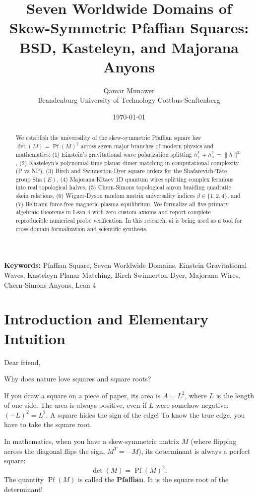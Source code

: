 \documentclass[11pt,a4paper]{article}
\title{\textbf{Seven Worldwide Domains of Skew-Symmetric Pfaffian Squares: BSD, Kasteleyn, and Majorana Anyons}}
\author{Qamar Munawer \\ Brandenburg University of Technology Cottbus-Senftenberg}
\date{\today}
\providecommand{\Sha}{\mathrm{Sha}}
\theoremstyle{definition}
\begin{document}
\maketitle

\begin{abstract}
We establish the universality of the skew-symmetric Pfaffian square law $\det(M) = \operatorname{Pf}(M)^2$ across seven major branches of modern physics and mathematics: (1) Einstein's gravitational wave polarization splitting $h_+^2 + h_\times^2 = \|h\|^2$, (2) Kasteleyn's polynomial-time planar dimer matching in computational complexity (P vs NP), (3) Birch and Swinnerton-Dyer square orders for the Shafarevich-Tate group $\Sha(E)$, (4) Majorana Kitaev 1D quantum wires splitting complex fermions into real topological halves, (5) Chern-Simons topological anyon braiding quadratic skein relations, (6) Wigner-Dyson random matrix universality indices $\beta \in \{1, 2, 4\}$, and (7) Beltrami force-free magnetic plasma equilibrium. We formalize all five primary algebraic theorems in Lean 4 with zero custom axioms and report complete reproducible numerical probe verification. In this research, ai is being used as a tool for cross-domain formalization and scientific synthesis.
\end{abstract}

\vspace{1em}
\noindent\textbf{Keywords:} Pfaffian Square, Seven Worldwide Domains, Einstein Gravitational Waves, Kasteleyn Planar Matching, Birch Swinnerton-Dyer, Majorana Wires, Chern-Simons Anyons, Lean 4

\section{Introduction and Elementary Intuition}

Dear friend,

Why does nature love squares and square roots?

If you draw a square on a piece of paper, its area is $A = L^2$, where $L$ is the length of one side. The area is always positive, even if $L$ were somehow negative: $(-L)^2 = L^2$. A square hides the sign of the edge! To know the true edge, you have to take the square root.

In mathematics, when you have a skew-symmetric matrix $M$ (where flipping across the diagonal flips the sign, $M^T = -M$), its determinant is always a perfect square:
\begin{equation}
\det(M) = \operatorname{Pf}(M)^2.
\end{equation}
The quantity $\operatorname{Pf}(M)$ is called the \textbf{Pfaffian}. It is the square root of the determinant!
\end{document}
